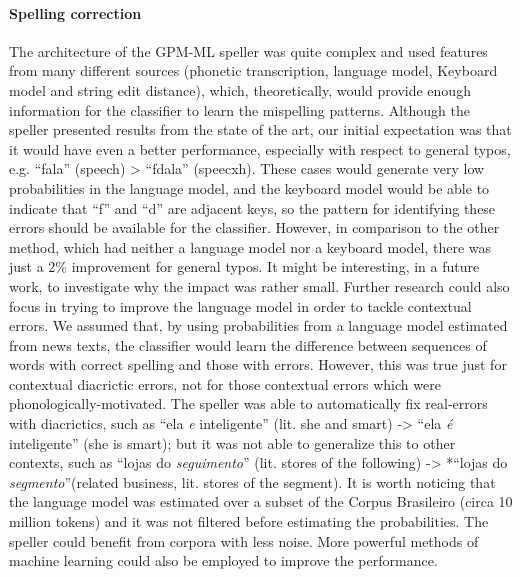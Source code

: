 \paragraph*{Spelling correction}
The architecture of the GPM-ML speller was quite complex and used features from many different sources (phonetic transcription, language model, Keyboard model and string edit distance), which, theoretically, would provide enough information for the classifier to learn the mispelling patterns. Although the speller presented results from the state of the art, our initial expectation was that it would have even a better performance, especially with respect to general typos, e.g. ``fala'' (speech) > ``fdala'' (speecxh). These cases would generate very low probabilities in the language model, and the keyboard model would be able to indicate that ``f'' and ``d'' are adjacent keys, so the pattern for identifying these errors should be available for the classifier. However, in comparison to the other method, which had neither a language model nor a keyboard model, there was just a 2\% improvement for general typos. It 
might be interesting, in a future work, to investigate why the impact was rather small. Further research could also focus in trying to improve the language model in order to tackle contextual errors. We assumed that, by using probabilities from a language model estimated from news texts, the classifier would learn the difference between sequences of words with correct spelling and those with errors. However, this was true just for contextual diacrictic errors, not for those contextual errors which were phonologically-motivated. The speller was able to automatically fix real-errors with diacrictics, such as ``ela \emph{e} inteligente'' (lit. she and smart) -> ``ela \emph{é} inteligente'' (she is smart); but it was not able to generalize this to other contexts, such as ``lojas do \emph{seguimento}'' (lit. stores of the following) -> *``lojas do \emph{segmento}''(related business, lit. stores of the segment). It is worth noticing that the language model was estimated over a subset of the Corpus Brasileiro (circa 10 million tokens) and it was not filtered before estimating the probabilities. The speller could benefit from corpora with less noise.  More powerful methods of machine learning could also be employed to improve the performance.

